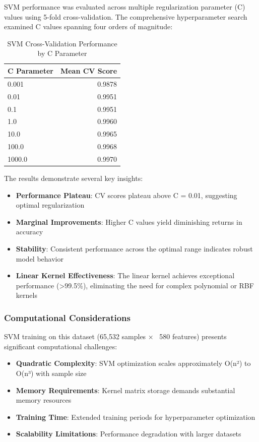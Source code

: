 \documentclass[12pt,a4paper]{article}
\begin{document}
SVM performance was evaluated across multiple regularization parameter (C) values using 5-fold cross-validation. The comprehensive hyperparameter search examined C values spanning four orders of magnitude:

\begin{table}[H]
\centering
\begin{tabular}{@{}lr@{}}
\toprule
\textbf{C Parameter} & \textbf{Mean CV Score} \\
\midrule
0.001 & 0.9878 \\
0.01 & 0.9951 \\
0.1 & 0.9951 \\
1.0 & 0.9960 \\
10.0 & 0.9965 \\
100.0 & 0.9968 \\
1000.0 & 0.9970 \\
\bottomrule
\end{tabular}
\caption{SVM Cross-Validation Performance by C Parameter}
\end{table}

The results demonstrate several key insights:

\begin{itemize}
    \item \textbf{Performance Plateau}: CV scores plateau above C = 0.01, suggesting optimal regularization
    \item \textbf{Marginal Improvements}: Higher C values yield diminishing returns in accuracy
    \item \textbf{Stability}: Consistent performance across the optimal range indicates robust model behavior
    \item \textbf{Linear Kernel Effectiveness}: The linear kernel achieves exceptional performance (>99.5\%), eliminating the need for complex polynomial or RBF kernels
\end{itemize}

\subsubsection{Computational Considerations}

SVM training on this dataset (65,532 samples × ~580 features) presents significant computational challenges:

\begin{itemize}
    \item \textbf{Quadratic Complexity}: SVM optimization scales approximately O(n²) to O(n³) with sample size
    \item \textbf{Memory Requirements}: Kernel matrix storage demands substantial memory resources
    \item \textbf{Training Time}: Extended training periods for hyperparameter optimization
    \item \textbf{Scalability Limitations}: Performance degradation with larger datasets
\end{itemize}
\end{document}
